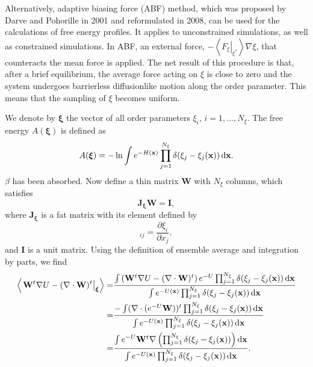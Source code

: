 Alternatively, adaptive biasing force (ABF) method, which was proposed by Darve and Pohorille in 2001\cite{DarveJCP2001} and reformulated in 2008\cite{DarveJCP2008}, can be used for the calculations of free energy profiles. It applies to unconstrained simulations, as well as constrained simulations. In ABF, an external force, $-\left<\left. F_\xi\right|_{\xi^\ast}\right>\nabla \xi$, that counteracts the mean force is applied. The net result of this procedure is that, after a brief equilibrium, the average force acting on $\xi$ is close to zero and the system undergoes barrierless diffusionlike motion along the order parameter. This means that the sampling of $\xi$ becomes uniform.

We denote by $\boldsymbol{\xi}$ the vector of all order parameters $\xi_i,\,i=1,\dots,N_\xi$. The free energy $A(\boldsymbol{\xi})$ is defined as
\begin{equation}
    A(\boldsymbol{\xi})=-\ln\int e^{-H(\mathbf{x})}\prod_{j=1}^{N_\xi}\delta(\xi_j-\xi_j(\mathbf{x}))\mathop{}\!\mathrm{d} \mathbf{x}.
\end{equation}
$\beta$ has been absorbed. Now define a thin matrix $\mathbf{W}$ with $N_\xi$ columns, which satisfies
\begin{equation}
    \mathbf{J}_{\boldsymbol{\xi}} \mathbf{W}=\mathbf{I},
\end{equation} 
where $\mathbf{J}_{\boldsymbol{\xi}}$ is a fat matrix with its element defined by
\begin{equation}
    [\mathbf{J}_{\boldsymbol{\xi}}]_{ij}=\frac{\partial \xi_i}{\partial x_j},
\end{equation}
and $\mathbf{I}$ is a unit matrix. Using the definition of ensemble average and integration by parts, we find
\begin{align}
    \left<\left.\mathbf{W}^t\nabla U-(\nabla\cdot \mathbf{W})^t\right|_{\boldsymbol{\xi}}\right>=&\frac{\int\left(\mathbf{W}^t\nabla U-(\nabla\cdot \mathbf{W})^t\right)e^{-U}\prod_{j=1}^{N_\xi}\delta(\xi_j-\xi_j(\mathbf{x}))\mathop{}\!\mathrm{d} \mathbf{x}}{\int e^{-U(\mathbf{x})}\prod_{j=1}^{N_\xi}\delta(\xi_j-\xi_j(\mathbf{x}))\mathop{}\!\mathrm{d} \mathbf{x}}\notag\\
    =&\frac{-\int (\nabla\cdot(e^{-U}\mathbf{W}))^t\prod_{j=1}^{N_\xi}\delta(\xi_j-\xi_j(\mathbf{x}))\mathop{}\!\mathrm{d}\mathbf{x}}{\int e^{-U(\mathbf{x})}\prod_{j=1}^{N_\xi}\delta(\xi_j-\xi_j(\mathbf{x}))\mathop{}\!\mathrm{d} \mathbf{x}}\notag\\
    =&\frac{\int e^{-U}\mathbf{W}^t\nabla\left(\prod_{j=1}^{N_\xi}\delta(\xi_j-\xi_j(\mathbf{x}))\right)\mathop{}\!\mathrm{d} \mathbf{x}}{\int e^{-U(\mathbf{x})}\prod_{j=1}^{N_\xi}\delta(\xi_j-\xi_j(\mathbf{x}))\mathop{}\!\mathrm{d} \mathbf{x}}.
\end{align}

